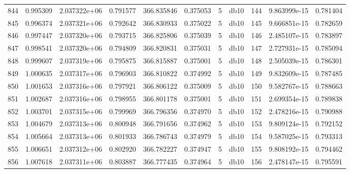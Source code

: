 \begin{tabular}{lrrrrrrlrrr}
844  &    0.995309 &        2.037322e+06 &  0.791577 &              366.835846 &    0.375053 &       5 &         db10 &    144 &   9.863999e-15 &      0.781404 \\
845  &    0.996374 &        2.037321e+06 &  0.792642 &              366.830933 &    0.375022 &       5 &         db10 &    145 &   9.666851e-15 &      0.782659 \\
846  &    0.997447 &        2.037320e+06 &  0.793715 &              366.825806 &    0.375039 &       5 &         db10 &    146 &   2.485107e-15 &      0.783897 \\
847  &    0.998541 &        2.037320e+06 &  0.794809 &              366.820831 &    0.375031 &       5 &         db10 &    147 &   2.727931e-15 &      0.785094 \\
848  &    0.999607 &        2.037319e+06 &  0.795875 &              366.815887 &    0.375001 &       5 &         db10 &    148 &   2.505039e-15 &      0.786301 \\
849  &    1.000635 &        2.037317e+06 &  0.796903 &              366.810822 &    0.374992 &       5 &         db10 &    149 &   9.832609e-15 &      0.787485 \\
850  &    1.001653 &        2.037316e+06 &  0.797921 &              366.806122 &    0.375009 &       5 &         db10 &    150 &   9.582767e-15 &      0.788663 \\
851  &    1.002687 &        2.037316e+06 &  0.798955 &              366.801178 &    0.375001 &       5 &         db10 &    151 &   2.699354e-15 &      0.789838 \\
852  &    1.003701 &        2.037315e+06 &  0.799969 &              366.796356 &    0.374970 &       5 &         db10 &    152 &   2.478216e-15 &      0.790988 \\
853  &    1.004679 &        2.037313e+06 &  0.800948 &              366.791656 &    0.374962 &       5 &         db10 &    153 &   9.809124e-15 &      0.792152 \\
854  &    1.005664 &        2.037313e+06 &  0.801933 &              366.786743 &    0.374979 &       5 &         db10 &    154 &   9.587025e-15 &      0.793313 \\
855  &    1.006651 &        2.037312e+06 &  0.802920 &              366.782227 &    0.374947 &       5 &         db10 &    155 &   9.808192e-15 &      0.794462 \\
856  &    1.007618 &        2.037311e+06 &  0.803887 &              366.777435 &    0.374964 &       5 &         db10 &    156 &   2.478147e-15 &      0.795591 \\

\end{tabular}
